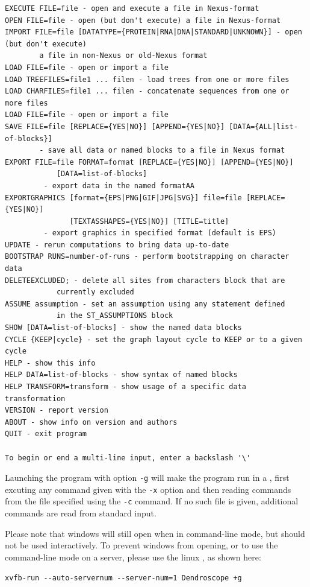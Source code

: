 \documentclass[11pt]{article}
\begin{document}
\begin{verbatim}
EXECUTE FILE=file - open and execute a file in Nexus-format
OPEN FILE=file - open (but don't execute) a file in Nexus-format
IMPORT FILE=file [DATATYPE={PROTEIN|RNA|DNA|STANDARD|UNKNOWN}] - open (but don't execute)
 		a file in non-Nexus or old-Nexus format
LOAD FILE=file - open or import a file
LOAD TREEFILES=file1 ... filen - load trees from one or more files
LOAD CHARFILES=file1 ... filen - concatenate sequences from one or more files
LOAD FILE=file - open or import a file
SAVE FILE=file [REPLACE={YES|NO}] [APPEND={YES|NO}] [DATA={ALL|list-of-blocks}]
        - save all data or named blocks to a file in Nexus format
EXPORT FILE=file FORMAT=format [REPLACE={YES|NO}] [APPEND={YES|NO}]
            [DATA=list-of-blocks]
         - export data in the named formatAA
EXPORTGRAPHICS [format={EPS|PNG|GIF|JPG|SVG}] file=file [REPLACE={YES|NO}]
               [TEXTASSHAPES={YES|NO}] [TITLE=title]
         - export graphics in specified format (default is EPS)
UPDATE - rerun computations to bring data up-to-date
BOOTSTRAP RUNS=number-of-runs - perform bootstrapping on character data
DELETEEXCLUDED; - delete all sites from characters block that are
            currently excluded
ASSUME assumption - set an assumption using any statement defined
            in the ST_ASSUMPTIONS block
SHOW [DATA=list-of-blocks] - show the named data blocks
CYCLE {KEEP|cycle} - set the graph layout cycle to KEEP or to a given cycle
HELP - show this info
HELP DATA=list-of-blocks - show syntax of named blocks
HELP TRANSFORM=transform - show usage of a specific data transformation
VERSION - report version
ABOUT - show info on version and authors
QUIT - exit program

To begin or end a multi-line input, enter a backslash '\'
\end{verbatim}

Launching the program with option {\tt -g} will make the program run
in a , first excuting any
command given with the {\tt -x} option and then reading
commands from the file specified using the {\tt -c} command.
If no such file is given, additional commands are read from standard input.

Please note that windows will still open when in command-line mode, but should not be used interactively.
To prevent windows from opening, or to use the command-line mode on a server, please use the linux ,
as shown here:

\begin{verbatim}
xvfb-run --auto-servernum --server-num=1 Dendroscope +g
\end{verbatim}
\end{document}
